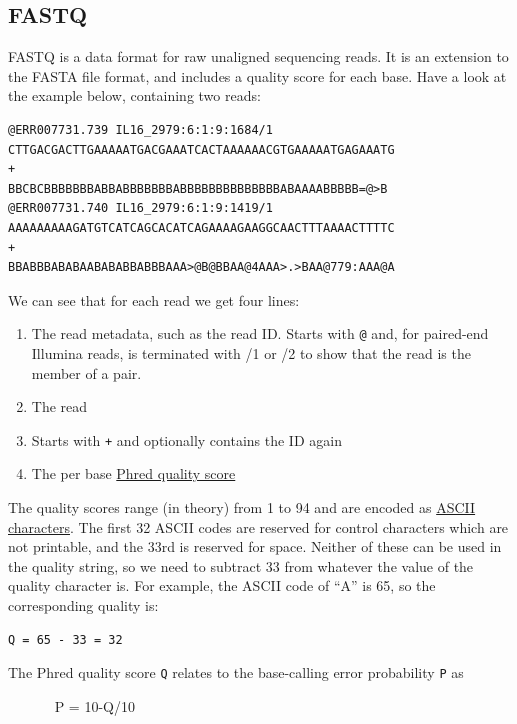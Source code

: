 \documentclass[11pt]{article}
\providecommand{\tightlist}{%
      \setlength{\itemsep}{0pt}\setlength{\parskip}{0pt}}
\begin{document}
    \hypertarget{fastq}{%
\subsection{FASTQ}\label{fastq}}

FASTQ is a data format for raw unaligned sequencing reads. It is an
extension to the FASTA file format, and includes a quality score for
each base. Have a look at the example below, containing two reads:

\begin{verbatim}
@ERR007731.739 IL16_2979:6:1:9:1684/1
CTTGACGACTTGAAAAATGACGAAATCACTAAAAAACGTGAAAAATGAGAAATG
+
BBCBCBBBBBBBABBABBBBBBBABBBBBBBBBBBBBBABAAAABBBBB=@>B
@ERR007731.740 IL16_2979:6:1:9:1419/1
AAAAAAAAAGATGTCATCAGCACATCAGAAAAGAAGGCAACTTTAAAACTTTTC
+
BBABBBABABAABABABBABBBAAA>@B@BBAA@4AAA>.>BAA@779:AAA@A
\end{verbatim}

We can see that for each read we get four lines:

\begin{enumerate}
\def\labelenumi{\arabic{enumi}.}
\tightlist
\item
  The read metadata, such as the read ID. Starts with \texttt{@} and,
  for paired-end Illumina reads, is terminated with /1 or /2 to show
  that the read is the member of a pair.
\item
  The read
\item
  Starts with \texttt{+} and optionally contains the ID again
\item
  The per base
  \href{https://en.wikipedia.org/wiki/Phred_quality_score}{Phred quality
  score}
\end{enumerate}

The quality scores range (in theory) from 1 to 94 and are encoded as
\href{https://en.wikipedia.org/wiki/ASCII}{ASCII characters}. The first
32 ASCII codes are reserved for control characters which are not
printable, and the 33rd is reserved for space. Neither of these can be
used in the quality string, so we need to subtract 33 from whatever the
value of the quality character is. For example, the ASCII code of ``A''
is 65, so the corresponding quality is:

\begin{verbatim}
Q = 65 - 33 = 32
\end{verbatim}

The Phred quality score \texttt{Q} relates to the base-calling error
probability \texttt{P} as

~~~~~~ P = 10-Q/10
\end{document}
